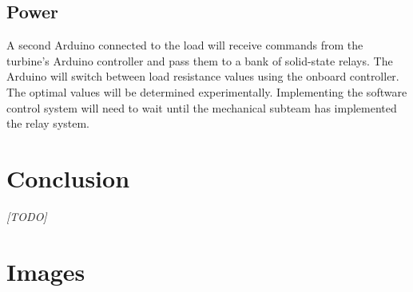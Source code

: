 \documentclass[11pt,letterpaper,conference]{IEEEtran}
\begin{document}
\subsection{Power}

A second Arduino connected to the load will receive commands from the turbine's
Arduino controller and pass them to a bank of solid-state relays. The
Arduino will switch between load resistance values using the onboard
controller. The optimal values will be determined experimentally. Implementing
the software control system will need to wait until the mechanical subteam has
implemented the relay system.

\section{Conclusion}

\emph{[TODO]}
\balance

\raggedright
\printbibliography

\clearpage
\onecolumn
\appendices
\section{Images}
\label{apx:images}
\end{document}
